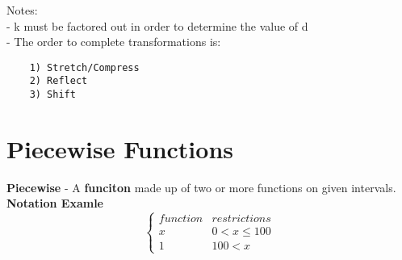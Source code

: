 \documentclass{article}
\begin{document}
    \noindent
    \newpage
    Notes:\\
    - k must be factored out in order to determine the value of d\\
    - The order to complete transformations is:
    \begin{verbatim}
    1) Stretch/Compress
    2) Reflect
    3) Shift
    \end{verbatim}


\newpage
\section*{Piecewise Functions}

\textbf{Piecewise} - A \textbf{funciton} made up of two or more functions on given intervals.\\
\textbf{Notation Examle}\\
\[ \begin{cases} 
    function & restrictions \\
    x & 0 < x\leq 100 \\
    1 & 100 < x 
 \end{cases}
\]


\end{document}
